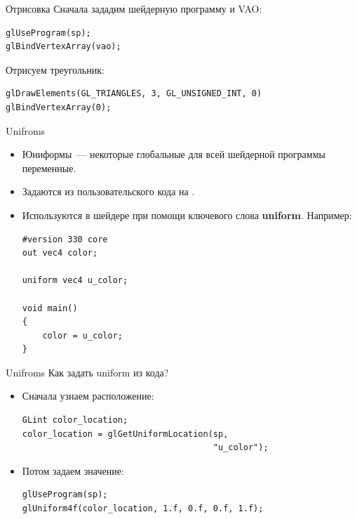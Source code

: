 \documentclass[aspectration=1610,t]{beamer}
\begin{document}
\begin{frame}[fragile]{Отрисовка}
    Сначала зададим шейдерную программу и VAO:
    {\small \begin{lstlisting}
glUseProgram(sp); 
glBindVertexArray(vao); 
    \end{lstlisting}}
    Отрисуем треугольник:
    {\small \begin{lstlisting}
glDrawElements(GL_TRIANGLES, 3, GL_UNSIGNED_INT, 0)
glBindVertexArray(0);
    \end{lstlisting}}
\end{frame}

\begin{frame}[fragile]{Unifroms}
    \begin{itemize}
        \item Юниформы~--- некоторые глобальные для всей шейдерной программы переменные.
        \item Задаются из пользовательского кода на \langcpp.
        \item Используются в шейдере при помощи ключевого слова {\bf uniform}. Например:
            {\small \begin{lstlisting}
#version 330 core
out vec4 color;

uniform vec4 u_color;

void main()
{
    color = u_color;
}
            \end{lstlisting}}
    \end{itemize}
\end{frame}

\begin{frame}[fragile]{Unifroms}
    Как задать uniform из кода?
    \begin{itemize}
        \item Сначала узнаем расположение:
            {\small \begin{lstlisting}
GLint color_location;
color_location = glGetUniformLocation(sp,
                                      "u_color");
            \end{lstlisting}}
        \item Потом задаем значение:
            {\small \begin{lstlisting}
glUseProgram(sp);
glUniform4f(color_location, 1.f, 0.f, 0.f, 1.f);
            \end{lstlisting}}
    \end{itemize}
\end{frame}
\end{document}
